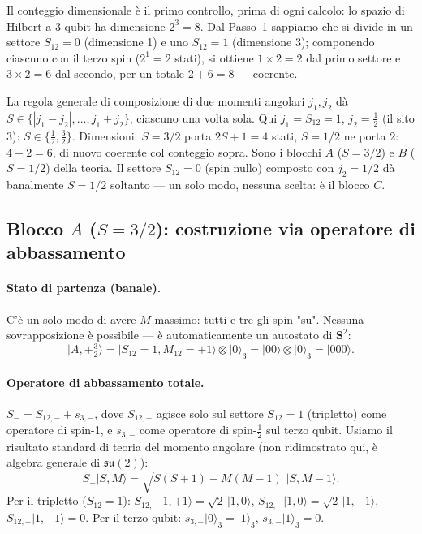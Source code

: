 \documentclass[11pt,a4paper]{article}
\newcommand{\ket}[1]{\lvert #1\rangle}
\begin{document}
Il conteggio dimensionale è il primo controllo, prima di ogni calcolo:
lo spazio di Hilbert a 3 qubit ha dimensione $2^3=8$. Dal Passo~1 sappiamo che
si divide in un settore $S_{12}=0$ (dimensione 1) e uno $S_{12}=1$ (dimensione 3);
componendo ciascuno con il terzo spin ($2^1=2$ stati), si ottiene $1\times2=2$
dal primo settore e $3\times2=6$ dal secondo, per un totale $2+6=8$ — coerente.

La regola generale di composizione di due momenti angolari $j_1,j_2$ dà
$S\in\{|j_1-j_2|,\dots,j_1+j_2\}$, ciascuno una volta sola. Qui $j_1=S_{12}=1$,
$j_2=\tfrac12$ (il sito 3): $S\in\{\tfrac12,\tfrac32\}$. Dimensioni: $S=3/2$
porta $2S{+}1=4$ stati, $S=1/2$ ne porta $2$: $4+2=6$, di nuovo coerente col
conteggio sopra. Sono i blocchi $A$ ($S=3/2$) e $B$ ($S=1/2$) della teoria.
Il settore $S_{12}=0$ (spin nullo) composto con $j_2=1/2$ dà banalmente
$S=1/2$ soltanto — un solo modo, nessuna scelta: è il blocco $C$.

\subsection{Blocco $A$ ($S=3/2$): costruzione via operatore di abbassamento}

\paragraph{Stato di partenza (banale).} C'è un solo modo di avere $M$ massimo:
tutti e tre gli spin "su". Nessuna sovrapposizione è possibile — è automaticamente
un autostato di $\mathbf S^2$:
\begin{equation}
\ket{A,{+}\tfrac32} = \ket{S_{12}{=}1,M_{12}{=}{+}1}\otimes\ket0_3 = \ket{00}\otimes\ket0_3 = \ket{000}.
\end{equation}

\paragraph{Operatore di abbassamento totale.} $S_-=S_{12,-}+s_{3,-}$, dove
$S_{12,-}$ agisce solo sul settore $S_{12}=1$ (tripletto) come operatore di
spin-1, e $s_{3,-}$ come operatore di spin-$\tfrac12$ sul terzo qubit. Usiamo
il risultato standard di teoria del momento angolare (non ridimostrato qui,
è algebra generale di $\mathfrak{su}(2)$):
\begin{equation}
S_-\ket{S,M} = \sqrt{S(S{+}1)-M(M{-}1)}\;\ket{S,M{-}1}.
\label{eq:ladder}
\end{equation}
Per il tripletto ($S_{12}=1$): $S_{12,-}\ket{1,{+}1}=\sqrt2\,\ket{1,0}$,
$S_{12,-}\ket{1,0}=\sqrt2\,\ket{1,{-}1}$, $S_{12,-}\ket{1,{-}1}=0$.
Per il terzo qubit: $s_{3,-}\ket0_3=\ket1_3$, $s_{3,-}\ket1_3=0$.
\end{document}
